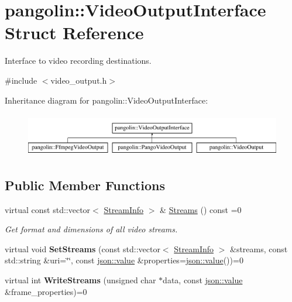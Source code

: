\hypertarget{structpangolin_1_1_video_output_interface}{}\section{pangolin\+:\+:Video\+Output\+Interface Struct Reference}
\label{structpangolin_1_1_video_output_interface}


Interface to video recording destinations.  




{\ttfamily \#include $<$video\+\_\+output.\+h$>$}

Inheritance diagram for pangolin\+:\+:Video\+Output\+Interface\+:\begin{figure}[H]
\begin{center}
\leavevmode
\includegraphics[height=1.924399cm]{structpangolin_1_1_video_output_interface}
\end{center}
\end{figure}
\subsection*{Public Member Functions}
\begin{DoxyCompactItemize}
\item 
virtual const std\+::vector$<$ \hyperlink{classpangolin_1_1_stream_info}{Stream\+Info} $>$ \& \hyperlink{structpangolin_1_1_video_output_interface_aa26739928e046aea3562d8c4afd7b006}{Streams} () const =0\hypertarget{structpangolin_1_1_video_output_interface_aa26739928e046aea3562d8c4afd7b006}{}\label{structpangolin_1_1_video_output_interface_aa26739928e046aea3562d8c4afd7b006}

\begin{DoxyCompactList}\small\item\em Get format and dimensions of all video streams. \end{DoxyCompactList}\item 
virtual void {\bfseries Set\+Streams} (const std\+::vector$<$ \hyperlink{classpangolin_1_1_stream_info}{Stream\+Info} $>$ \&streams, const std\+::string \&uri=\char`\"{}\char`\"{}, const \hyperlink{classpangolin_1_1json_1_1value}{json\+::value} \&properties=\hyperlink{classpangolin_1_1json_1_1value}{json\+::value}())=0\hypertarget{structpangolin_1_1_video_output_interface_aa7ea42f95ac003680fa12124037f5aae}{}\label{structpangolin_1_1_video_output_interface_aa7ea42f95ac003680fa12124037f5aae}

\item 
virtual int {\bfseries Write\+Streams} (unsigned char $\ast$data, const \hyperlink{classpangolin_1_1json_1_1value}{json\+::value} \&frame\+\_\+properties)=0\hypertarget{structpangolin_1_1_video_output_interface_a2fff62f48a6a7a208a1780f579e4844a}{}\label{structpangolin_1_1_video_output_interface_a2fff62f48a6a7a208a1780f579e4844a}

\end{DoxyCompactItemize}


